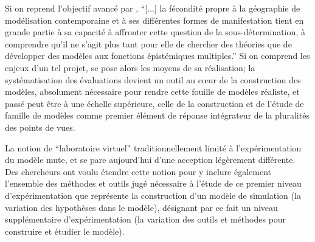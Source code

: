 Si on reprend l'objectif avancé par \autocite{Varenne2014}, \enquote{[...] la fécondité propre à la géographie de modélisation contemporaine et à ses différentes formes de manifestation tient en grande partie à sa capacité à affronter cette question de la sous-détermination, à comprendre qu’il ne s’agit plus tant pour elle de chercher des théories que de développer des modèles aux fonctions épistémiques multiples.} Si on comprend les enjeux d'un tel projet, se pose alors les moyens de sa réalisation; la systématisation des évaluations devient un outil au cœur de la construction des modèles, absolument nécessaire pour rendre cette fouille de modèles réaliste, et passé peut être à une échelle supérieure, celle de la construction et de l'étude de famille de modèles comme premier élément de réponse intégrateur de la pluralités des points de vues.

La notion de \enquote{laboratoire virtuel} traditionnellement limité à l'expérimentation du modèle mute, et se pare aujourd'hui d'une acception légèrement différente. Des chercheurs \autocite{Schmitt2014} \autocite{Amblard2003} ont voulu étendre cette notion pour y inclure également l'ensemble des méthodes et outils jugé nécessaire à l'étude de ce premier niveau d'expérimentation que représente la construction d'un modèle de simulation (la variation des hypothèses dans le modèle), désignant par ce fait un niveau supplémentaire d’expérimentation (la variation des outils et méthodes pour construire et étudier le modèle). 



